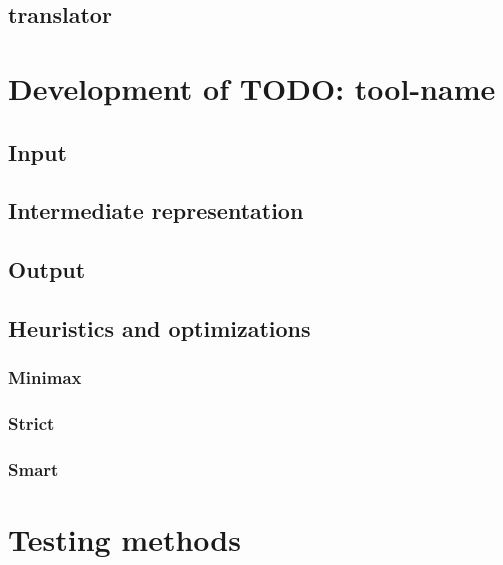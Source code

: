 \section{translator}



\chapter{Development of TODO: tool-name}
\section{Input}
\section{Intermediate representation}
\section{Output}
\section{Heuristics and optimizations}
\subsection{Minimax}
\subsection{Strict}
\subsection{Smart}


\chapter{Testing methods}


